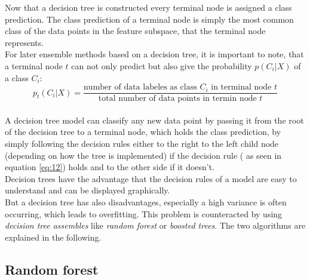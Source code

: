 Now that a decision tree is constructed every terminal node is assigned a class prediction. The class prediction of a terminal node is simply the most common class of the data points in the feature subspace, that the terminal node represents.
\\
For later ensemble methods based on a decision tree, it is important to note, that a terminal node $t$ can not only predict but also give the probability $p(C_i|X)$ of a class $C_i$:
\begin{equation} \label{eq:20}
p_t(C_i|X)=\frac{\text{number of data labeles as class }C_i\text{ in terminal node }t}{\text{total number of data points in termin node }t}
\end{equation}
\\

A decision tree model can classify any new data point by passing it from the root of the decision tree to a terminal node, which holds the class prediction, by simply following the decision rules either to the right to the left child node (depending on how the tree is implemented) if the decision rule ( as seen in equation \ref{eq:12}) holds and to the other side if it doesn't.
\\
Decision trees have the advantage that the decision rules of a model are easy to understand and can be displayed graphically. \cite{Breiman.post2005cop.1984} \cite{Seni.2010}
\\

But a decision tree has also disadvantages, especially a high variance is often occurring, which leads to overfitting. This problem is counteracted by using \emph{decision tree assembles} like \emph{random forest} or \emph{boosted trees}. The two algorithms are explained in the following.

\subsection{Random forest}

